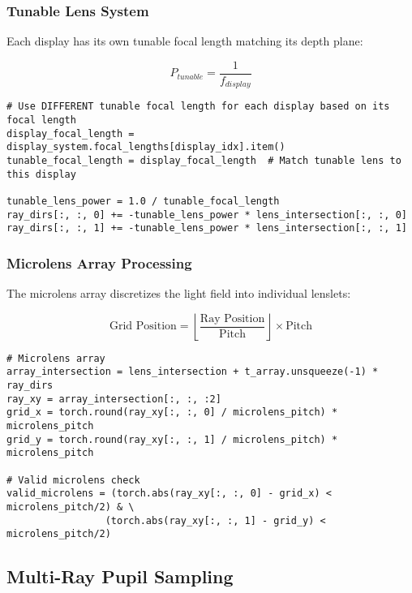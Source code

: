 \documentclass[12pt,a4paper]{article}
\begin{document}
\subsubsection{Tunable Lens System}
Each display has its own tunable focal length matching its depth plane:

\begin{equation}
P_{tunable} = \frac{1}{f_{display}}
\end{equation}

\begin{lstlisting}[caption=Tunable Lens Implementation]
# Use DIFFERENT tunable focal length for each display based on its focal length
display_focal_length = display_system.focal_lengths[display_idx].item()
tunable_focal_length = display_focal_length  # Match tunable lens to this display

tunable_lens_power = 1.0 / tunable_focal_length
ray_dirs[:, :, 0] += -tunable_lens_power * lens_intersection[:, :, 0]
ray_dirs[:, :, 1] += -tunable_lens_power * lens_intersection[:, :, 1]
\end{lstlisting}

\subsubsection{Microlens Array Processing}
The microlens array discretizes the light field into individual lenslets:

\begin{equation}
\text{Grid Position} = \left\lfloor \frac{\text{Ray Position}}{\text{Pitch}} \right\rfloor \times \text{Pitch}
\end{equation}

\begin{lstlisting}[caption=Microlens Array Processing]
# Microlens array
array_intersection = lens_intersection + t_array.unsqueeze(-1) * ray_dirs
ray_xy = array_intersection[:, :, :2]
grid_x = torch.round(ray_xy[:, :, 0] / microlens_pitch) * microlens_pitch  
grid_y = torch.round(ray_xy[:, :, 1] / microlens_pitch) * microlens_pitch

# Valid microlens check
valid_microlens = (torch.abs(ray_xy[:, :, 0] - grid_x) < microlens_pitch/2) & \
                 (torch.abs(ray_xy[:, :, 1] - grid_y) < microlens_pitch/2)
\end{lstlisting}

\subsection{Multi-Ray Pupil Sampling}
\end{document}
